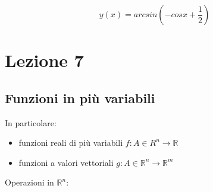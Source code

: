 \documentclass[11pt]{article}
\begin{document}
\[
    y(x) = arcsin(-cosx +\frac{1}{2})
\]
   
\newpage

\section{Lezione 7}

\subsection{Funzioni in più variabili}

In particolare:

\begin{itemize}
    \item funzioni reali di più variabili $f: A \in R^{n} \rightarrow \mathbb{R}$
    \item funzioni a valori vettoriali $g: A \in \mathbb{R}^{n}\rightarrow \mathbb{R}^{m}$
\end{itemize}




Operazioni in $\mathbb{R}^{n}$:
\end{document}
